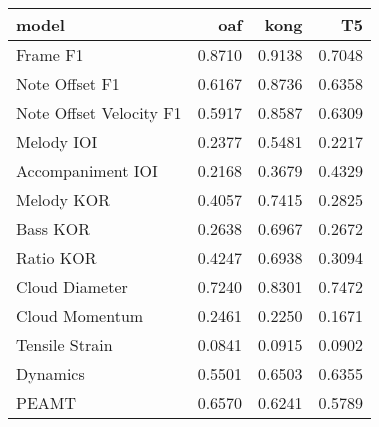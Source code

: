 \begin{tabular}{lrrr}
\toprule
model & oaf & kong & T5 \\
\midrule
Frame F1 & 0.8710 & 0.9138 & 0.7048 \\
Note Offset F1 & 0.6167 & 0.8736 & 0.6358 \\
Note Offset Velocity F1 & 0.5917 & 0.8587 & 0.6309 \\
Melody IOI & 0.2377 & 0.5481 & 0.2217 \\
Accompaniment IOI & 0.2168 & 0.3679 & 0.4329 \\
Melody KOR & 0.4057 & 0.7415 & 0.2825 \\
Bass KOR & 0.2638 & 0.6967 & 0.2672 \\
Ratio KOR & 0.4247 & 0.6938 & 0.3094 \\
Cloud Diameter & 0.7240 & 0.8301 & 0.7472 \\
Cloud Momentum & 0.2461 & 0.2250 & 0.1671 \\
Tensile Strain & 0.0841 & 0.0915 & 0.0902 \\
Dynamics & 0.5501 & 0.6503 & 0.6355 \\
PEAMT & 0.6570 & 0.6241 & 0.5789 \\
\bottomrule
\end{tabular}
